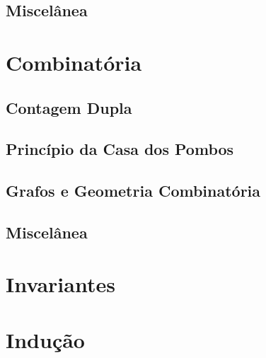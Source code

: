 \subsection{Miscelânea}

\pagebreak

\section{Combinatória}
\subsection{Contagem Dupla}

\subsection{Princípio da Casa dos Pombos}

\subsection{Grafos e Geometria Combinatória}

\subsection{Miscelânea}


\section{Invariantes}

\pagebreak

\section{Indução}

\pagebreak


